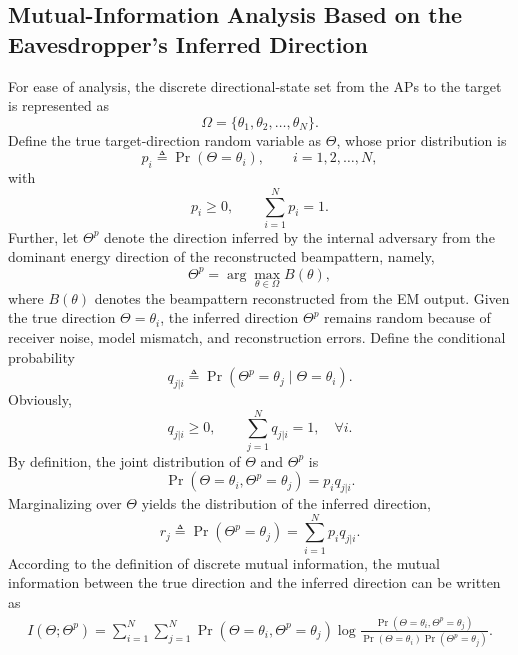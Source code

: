 \documentclass[conference,twocolumn,a4paper]{IEEEtran}
\begin{document}
\subsection{Mutual-Information Analysis Based on the Eavesdropper's Inferred Direction}
For ease of analysis, the discrete directional-state set from the APs to the target is represented as
\begin{equation}
\Omega=\{\theta_1,\theta_2,\dots,\theta_N\}.
\end{equation}
Define the true target-direction random variable as $\Theta$, whose prior distribution is
\begin{equation}
p_i\triangleq\Pr(\Theta=\theta_i),\qquad i=1,2,\dots,N,
\end{equation}
with
\begin{equation}
p_i\ge 0,\qquad \sum_{i=1}^{N}p_i=1.
\end{equation}
Further, let $\Theta^p$ denote the direction inferred by the internal adversary from the dominant energy direction of the reconstructed beampattern, namely,
\begin{equation}
\Theta^p=\arg\max_{\theta\in\Omega} B(\theta),
\end{equation}
where $B(\theta)$ denotes the beampattern reconstructed from the EM output. Given the true direction $\Theta=\theta_i$, the inferred direction $\Theta^p$ remains random because of receiver noise, model mismatch, and reconstruction errors. Define the conditional probability
\begin{equation}
q_{j|i}\triangleq\Pr(\Theta^p=\theta_j\mid \Theta=\theta_i).
\end{equation}
Obviously,
\begin{equation}
q_{j|i}\ge 0,\qquad \sum_{j=1}^{N}q_{j|i}=1,\quad \forall i.
\end{equation}
By definition, the joint distribution of $\Theta$ and $\Theta^p$ is
\begin{equation}
\Pr(\Theta=\theta_i,\Theta^p=\theta_j)=p_i q_{j|i}.
\end{equation}
Marginalizing over $\Theta$ yields the distribution of the inferred direction,
\begin{equation}
r_j\triangleq\Pr(\Theta^p=\theta_j)=\sum_{i=1}^{N} p_i q_{j|i}.
\end{equation}
According to the definition of discrete mutual information, the mutual information between the true direction and the inferred direction can be written as
\begin{equation}
\begin{aligned}
I(\Theta;\Theta^p)
=\sum_{i=1}^{N}\sum_{j=1}^{N}
\Pr(\Theta=\theta_i,\Theta^p=\theta_j)
\log
\frac{\Pr(\Theta=\theta_i,\Theta^p=\theta_j)}{\Pr(\Theta=\theta_i)\Pr(\Theta^p=\theta_j)}.
\end{aligned}
\end{equation}
\end{document}
